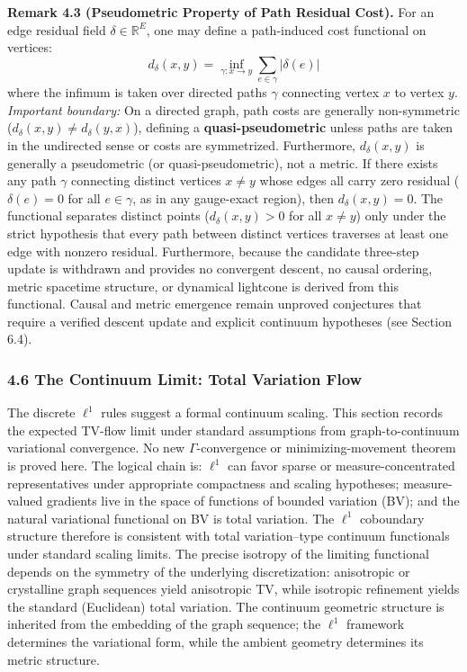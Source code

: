 \documentclass[
]{article}
\begin{document}
\textbf{Remark 4.3 (Pseudometric Property of Path Residual Cost).} For an edge residual field \(\delta \in \mathbb{R}^E\), one may define a path-induced cost functional on vertices:
\[ d_\delta(x, y) = \inf_{\gamma: x \to y} \sum_{e \in \gamma} |\delta(e)| \]
where the infimum is taken over directed paths \(\gamma\) connecting vertex \(x\) to vertex \(y\).
\emph{Important boundary:} On a directed graph, path costs are generally non-symmetric (\(d_\delta(x,y) \ne d_\delta(y,x)\)), defining a \textbf{quasi-pseudometric} unless paths are taken in the undirected sense or costs are symmetrized. Furthermore, \(d_\delta(x, y)\) is generally a pseudometric (or quasi-pseudometric), not a metric. If there exists any path \(\gamma\) connecting distinct vertices \(x \ne y\) whose edges all carry zero residual (\(\delta(e) = 0\) for all \(e \in \gamma\), as in any gauge-exact region), then \(d_\delta(x, y) = 0\). The functional separates distinct points (\(d_\delta(x, y) > 0\) for all \(x \ne y\)) only under the strict hypothesis that every path between distinct vertices traverses at least one edge with nonzero residual.
Furthermore, because the candidate three-step update is withdrawn and provides no convergent descent, no causal ordering, metric spacetime structure, or dynamical lightcone is derived from this functional. Causal and metric emergence remain unproved conjectures that require a verified descent update and explicit continuum hypotheses (see Section 6.4).

\subsubsection{4.6 The Continuum Limit: Total Variation Flow}\label{the-continuum-limit-total-variation-flow}

The discrete \(\ell^1\) rules suggest a formal continuum scaling.
This section records the expected TV-flow limit under standard assumptions
from graph-to-continuum variational convergence. No new \(\Gamma\)-convergence
or minimizing-movement theorem is proved here. The logical chain is: \(\ell^1\) can favor sparse or measure-concentrated representatives under appropriate compactness and scaling hypotheses; measure-valued gradients live in the space of functions of bounded variation (BV); and the natural variational functional on BV is total variation. The \(\ell^1\) coboundary structure therefore is consistent with total variation--type continuum functionals under standard scaling limits. The precise isotropy of the limiting functional depends on the symmetry of the underlying discretization: anisotropic or crystalline graph sequences yield anisotropic TV, while isotropic refinement yields the standard (Euclidean) total variation. The continuum geometric structure is inherited from the embedding of the graph sequence; the \(\ell^1\) framework determines the variational form, while the ambient geometry determines its metric structure.
\end{document}
